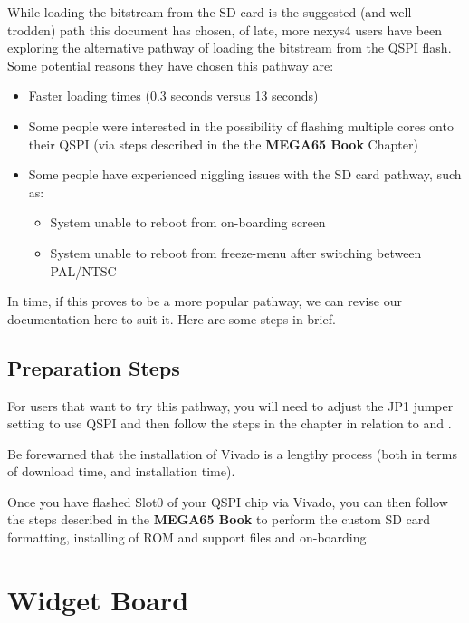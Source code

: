 While loading the bitstream from the SD card is the suggested (and well-trodden) path this document has chosen, of late, more nexys4 users have been exploring the alternative pathway of loading the bitstream from the QSPI flash. Some potential reasons they have chosen this pathway are:

\begin{itemize}
  \item Faster loading times (0.3 seconds versus 13 seconds)
  \item Some people were interested in the possibility of flashing multiple
        cores onto their QSPI (via steps described in the
\ifdefined\printmanual
the {\bf MEGA65 Book}
\else
{}
\fi
		Chapter)
  \item Some people have experienced niggling issues with the SD card pathway, such as:
    \begin{itemize}
      \item System unable to reboot from on-boarding screen
      \item System unable to reboot from freeze-menu after switching between PAL/NTSC
    \end{itemize}
\end{itemize}

In time, if this proves to be a more popular pathway, we can revise our documentation here to suit it. Here are some steps in brief.

\subsection{Preparation Steps}

For users that want to try this pathway, you will need to adjust the JP1 jumper setting to use QSPI and then follow the steps in the  chapter in relation to  and .

Be forewarned that the installation of Vivado is a lengthy process (both in terms of download time, and installation time).

Once you have flashed Slot0 of your QSPI chip via Vivado, you can then follow the steps
described in
\ifdefined\printmanual
the {\bf MEGA65 Book}
\else
{}
\fi
to perform the custom SD card formatting,
installing of ROM and support files and on-boarding.

\section{Widget Board}

